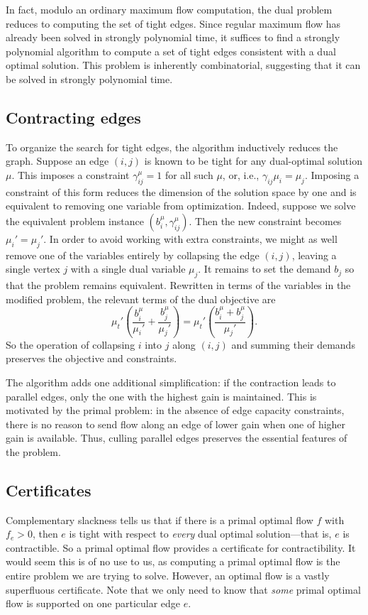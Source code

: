 \documentclass[11pt]{article}
\theoremstyle{definition}
\theoremstyle{definition}
\newcommand{\biu}{b_{i}^{\mu}}
\newcommand{\gij}{\gamma_{ij}}
\newcommand{\giij}{\gamma_{ij}^{\mu}}
\begin{document}
    In fact, modulo an ordinary maximum flow computation, the dual problem reduces to computing
    the set of tight edges. Since regular maximum
    flow has already been solved in strongly polynomial time, it suffices to find a strongly polynomial
    algorithm to compute a set of tight edges consistent with a dual optimal solution. This problem
    is inherently combinatorial, suggesting that it can be solved in strongly polynomial time.
    
    \subsection{Contracting edges}
    To organize the search for tight edges, the algorithm inductively reduces the graph.
    Suppose an edge $(i, j)$ is known to be tight for any dual-optimal solution $\mu$. This
    imposes a constraint $\giij = 1$ for all such $\mu$, or, i.e., $\gij \mu_i = \mu_j$.
    Imposing a constraint of this form reduces the dimension of the solution
    space by one and is equivalent to removing one variable from optimization. Indeed,
    suppose we solve the equivalent problem instance $(\biu, \giij)$. Then the new constraint
    becomes $\mu_i' = \mu_j'$. In order to avoid working with extra constraints, we might
    as well remove one of the variables entirely by collapsing the edge $(i, j)$, leaving a single
    vertex $j$ with a single dual variable $\mu_j$. It remains to set the demand $b_j$ so
    that the problem remains equivalent. Rewritten in terms of the variables in
    the modified problem, the relevant terms of the dual objective are
    \[ \mu_t' \left(\frac{b_i^\mu}{\mu_i'} + \frac{b_j^\mu}{\mu_j'}\right)
     = \mu_t' \left(\frac{b_i^\mu + b_j^\mu}{\mu_j'}\right). \]
	So the operation of collapsing $i$ into $j$ along $(i, j)$ and summing their demands
	preserves the objective and constraints.
	
	The algorithm adds one additional simplification: if the contraction leads to parallel edges,
	only the one with the highest gain is maintained. This is motivated by the primal problem: in
	the absence of edge capacity constraints, there is no reason to send flow along an edge of
	lower gain when one of higher gain is available. Thus, culling parallel edges preserves the
	essential features of the problem.
	
	\subsection{Certificates}
	Complementary slackness tells us that if there is a primal optimal flow $f$ with
	$f_e > 0$, then $e$ is tight with respect to \emph{every} dual optimal solution---that
	is, $e$ is contractible. So a primal optimal flow provides a certificate for contractibility.
	It would seem this is of no use to us, as computing a primal optimal flow is the entire
	problem we are trying to solve. However, an optimal flow is a vastly superfluous certificate.
	Note that we only need to know that \emph{some}
	primal optimal flow is supported on one particular edge $e$.
	
\end{document}
